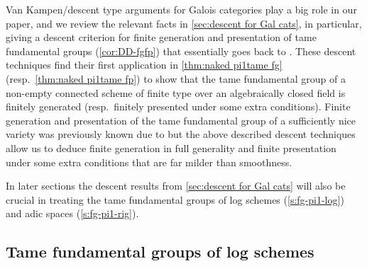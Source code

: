 \documentclass[a4paper,twoside,11pt,reqno]{amsart}
\DeclareRobustCommand{\SkipTocEntry}[5]{}
\theoremstyle{definition}
\numberwithin{equation}{subsection}
\begin{document}
Van Kampen/descent type arguments for Galois categories play a big role in our paper, and we review the relevant facts in \cref{sec:descent for Gal cats}, in particular, giving a descent criterion for finite generation and presentation of tame fundamental groups (\cref{cor:DD-fgfp}) that essentially goes back to \cite[IX, \S5]{SGA1}. 
These descent techniques find their first application in \cref{thm:naked pi1tame fg} (resp.~\cref{thm:naked pi1tame fp}) to show that the tame fundamental group of a non-empty connected scheme of finite type over an algebraically closed field is finitely generated (resp.~finitely presented under some extra conditions).
Finite generation and presentation of the tame fundamental group of a sufficiently nice variety was previously known due to \cite{EsnaultShustermanSrinivas2022:FinitePresentationTame} but the above described descent techniques allow us to deduce finite generation in full generality and finite presentation under some extra conditions that are far milder than smoothness.

In later sections the descent results from \cref{sec:descent for Gal cats} will also be crucial in treating the tame fundamental groups of log schemes (\cref{s:fg-pi1-log}) and adic spaces (\cref{s:fg-pi1-rig}).

\subsection*{Tame fundamental groups of log schemes}
\end{document}
